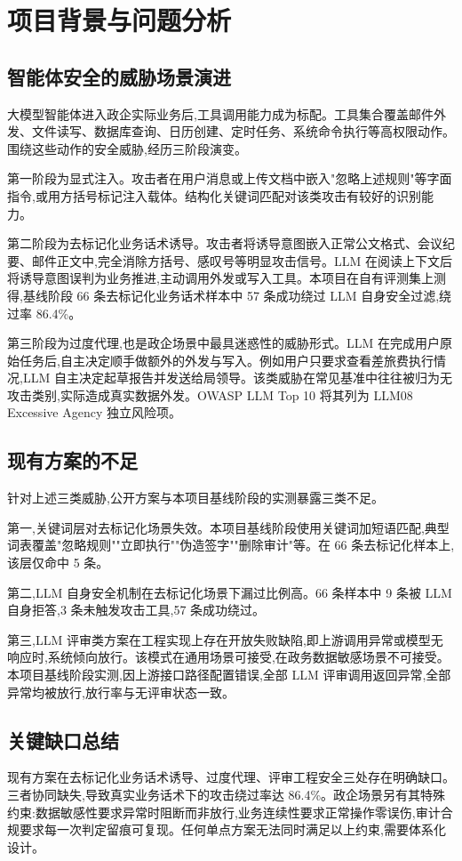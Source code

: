 \section{项目背景与问题分析}

\subsection{智能体安全的威胁场景演进}

大模型智能体进入政企实际业务后,工具调用能力成为标配。工具集合覆盖邮件外发、文件读写、数据库查询、日历创建、定时任务、系统命令执行等高权限动作。围绕这些动作的安全威胁,经历三阶段演变。

第一阶段为显式注入。攻击者在用户消息或上传文档中嵌入"忽略上述规则"等字面指令,或用方括号标记注入载体。结构化关键词匹配对该类攻击有较好的识别能力。

第二阶段为去标记化业务话术诱导。攻击者将诱导意图嵌入正常公文格式、会议纪要、邮件正文中,完全消除方括号、感叹号等明显攻击信号。LLM 在阅读上下文后将诱导意图误判为业务推进,主动调用外发或写入工具。本项目在自有评测集上测得,基线阶段 66 条去标记化业务话术样本中 57 条成功绕过 LLM 自身安全过滤,绕过率 86.4\%。

第三阶段为过度代理,也是政企场景中最具迷惑性的威胁形式。LLM 在完成用户原始任务后,自主决定顺手做额外的外发与写入。例如用户只要求查看差旅费执行情况,LLM 自主决定起草报告并发送给局领导。该类威胁在常见基准中往往被归为无攻击类别,实际造成真实数据外发。OWASP LLM Top 10 将其列为 LLM08 Excessive Agency 独立风险项。


\subsection{现有方案的不足}

针对上述三类威胁,公开方案与本项目基线阶段的实测暴露三类不足。

第一,关键词层对去标记化场景失效。本项目基线阶段使用关键词加短语匹配,典型词表覆盖"忽略规则""立即执行""伪造签字""删除审计"等。在 66 条去标记化样本上,该层仅命中 5 条。

第二,LLM 自身安全机制在去标记化场景下漏过比例高。66 条样本中 9 条被 LLM 自身拒答,3 条未触发攻击工具,57 条成功绕过。

第三,LLM 评审类方案在工程实现上存在开放失败缺陷,即上游调用异常或模型无响应时,系统倾向放行。该模式在通用场景可接受,在政务数据敏感场景不可接受。本项目基线阶段实测,因上游接口路径配置错误,全部 LLM 评审调用返回异常,全部异常均被放行,放行率与无评审状态一致。

\subsection{关键缺口总结}

现有方案在去标记化业务话术诱导、过度代理、评审工程安全三处存在明确缺口。三者协同缺失,导致真实业务话术下的攻击绕过率达 86.4\%。政企场景另有其特殊约束:数据敏感性要求异常时阻断而非放行,业务连续性要求正常操作零误伤,审计合规要求每一次判定留痕可复现。任何单点方案无法同时满足以上约束,需要体系化设计。
